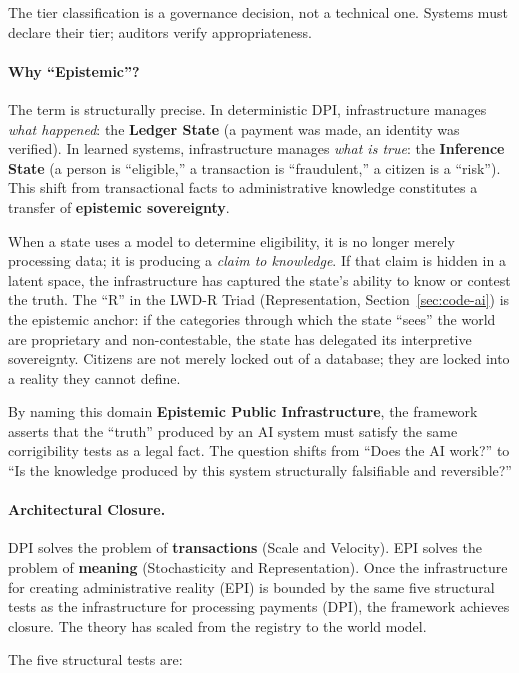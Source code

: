 \documentclass[11pt,a4paper]{article}
\theoremstyle{definition}
\begin{document}
The tier classification is a governance decision, not a technical one. Systems must declare their tier; auditors verify appropriateness.

\paragraph{Why ``Epistemic''?} The term is structurally precise. In deterministic DPI, infrastructure manages \textit{what happened}: the \textbf{Ledger State} (a payment was made, an identity was verified). In learned systems, infrastructure manages \textit{what is true}: the \textbf{Inference State} (a person is ``eligible,'' a transaction is ``fraudulent,'' a citizen is a ``risk''). This shift from transactional facts to administrative knowledge constitutes a transfer of \textbf{epistemic sovereignty}.

When a state uses a model to determine eligibility, it is no longer merely processing data; it is producing a \textit{claim to knowledge}. If that claim is hidden in a latent space, the infrastructure has captured the state's ability to know or contest the truth. The ``R'' in the LWD-R Triad (Representation, Section~\ref{sec:code-ai}) is the epistemic anchor: if the categories through which the state ``sees'' the world are proprietary and non-contestable, the state has delegated its interpretive sovereignty. Citizens are not merely locked out of a database; they are locked into a reality they cannot define.

By naming this domain \textbf{Epistemic Public Infrastructure}, the framework asserts that the ``truth'' produced by an AI system must satisfy the same corrigibility tests as a legal fact. The question shifts from ``Does the AI work?'' to ``Is the knowledge produced by this system structurally falsifiable and reversible?''

\paragraph{Architectural Closure.} DPI solves the problem of \textbf{transactions} (Scale and Velocity). EPI solves the problem of \textbf{meaning} (Stochasticity and Representation). Once the infrastructure for creating administrative reality (EPI) is bounded by the same five structural tests as the infrastructure for processing payments (DPI), the framework achieves closure. The theory has scaled from the registry to the world model.

The five structural tests are:
\end{document}
